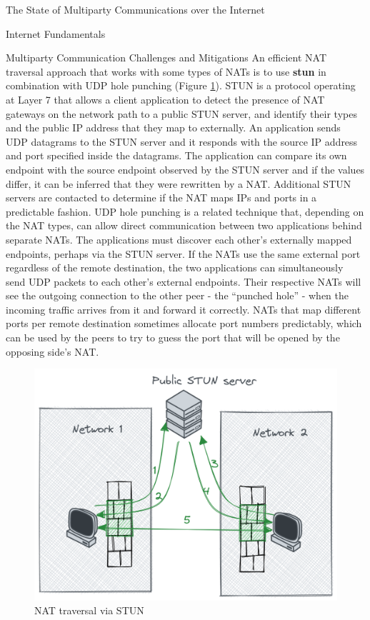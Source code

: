 \begin{frame}[fragile]{The State of Multiparty Communications over the
Internet}
\begin{block}{Internet Fundamentals}
\begin{block}{Multiparty Communication Challenges and Mitigations}
An efficient NAT traversal approach that works with some types of NATs
is to use \textbf{\gls{stun}} \autocite{stunRFC} in combination with UDP
hole punching (Figure \ref{nat-traversal}). STUN is a protocol operating
at Layer 7 that allows a client application to detect the presence of
NAT gateways on the network path to a public STUN server, and identify
their types and the public IP address that they map to externally. An
application sends UDP datagrams to the STUN server and it responds with
the source IP address and port specified inside the datagrams. The
application can compare its own endpoint with the source endpoint
observed by the STUN server and if the values differ, it can be inferred
that they were rewritten by a NAT. Additional STUN servers are contacted
to determine if the NAT maps IPs and ports in a predictable fashion. UDP
hole punching is a related technique that, depending on the NAT types,
can allow direct communication between two applications behind separate
NATs. The applications must discover each other's externally mapped
endpoints, perhaps via the STUN server.  If the NATs use
the same external port regardless of the remote destination, the two
applications can simultaneously send UDP packets to each other's
external endpoints. Their respective NATs will see the outgoing
connection to the other peer - the ``punched hole'' - when the incoming
traffic arrives from it and forward it correctly. NATs that map
different ports per remote destination sometimes allocate port numbers
predictably, which can be used by the peers to try to guess the port
that will be opened by the opposing side's NAT.


\begin{figure}
\centering
\includegraphics[width=\textwidth,height=0.25\textheight]{thesis/../figures/nat-traversal.png}
\caption{NAT traversal via STUN\label{nat-traversal}}
\end{figure}


\end{block}
\end{block}
\end{frame}
